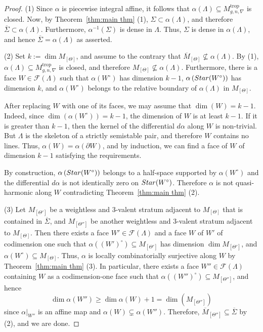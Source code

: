 \documentclass[11pt,reqno]{amsart}
\numberwithin{equation}{section}
\theoremstyle{definition}
\newcommand{\trop}{\mathrm{trop}}
\newcommand{\CF}{{\mathcal F}}
\newcommand{\Star}{{\rm Star}}
\theoremstyle{remark}
\begin{document}
\begin{proof}
(1) Since $\alpha$ is piecewise integral affine, it follows that $\alpha(\Lambda)\subseteq M^{\trop}_{g,n,\nabla}$ is closed. Now, by Theorem~\ref{thm:main thm} (1), $\Sigma\subset \alpha(\Lambda)$, and therefore $\overline\Sigma\subset \alpha(\Lambda)$. Furthermore, $\alpha^{-1}(\Sigma)$ is dense in $\Lambda$. Thus, $\Sigma$ is dense in $\alpha(\Lambda)$, and hence $\overline\Sigma=\alpha(\Lambda)$ as asserted.

(2) Set $k:=\dim M_{[\Theta]}$, and assume to the contrary that $\overline M_{[\Theta]}\nsubseteq \alpha(\Lambda)$. By (1), $\alpha(\Lambda)\subseteq M^{\trop}_{g,n,\nabla}$ is closed, and therefore $M_{[\Theta]}\nsubseteq \alpha(\Lambda)$. Furthermore, there is a face $W\in \CF(\Lambda)$ such that $\alpha(W^\circ)$ has dimension $k-1$, $\alpha\left(\Star(W^\circ)\right)$ has dimension $k$, and $\alpha(W^\circ)$ belongs to the relative boundary of $\alpha(\Lambda)$ in $M_{[\Theta]}$.

After replacing $W$ with one of its faces, we may assume that $\dim(W)=k-1$. Indeed, since $\dim(\alpha(W^\circ))=k-1$, the dimension of $W$ is at least $k-1$. If it is greater than $k-1$, then the kernel of the differential $d\alpha$ along $W$ is non-trivial. But $\Lambda$ is the skeleton of a strictly semistable pair, and therefore $W$ contains no lines. Thus, $\alpha(W)=\alpha(\partial W)$, and by induction, we can find a face of $W$ of dimension $k-1$ satisfying the requirements.

By construction, $\alpha\left(\Star(W^\circ)\right)$ belongs to a half-space supported by $\alpha(W^\circ)$ and the differential $d\alpha$ is not identically zero on $\Star(W^\circ)$. Therefore $\alpha$ is not quasi-harmonic along $W$ contradicting Theorem~\ref{thm:main thm} (2).

(3) Let $M_{[\Theta']}$ be a weightless and $3$-valent stratum adjacent to $M_{[\Theta]}$ that is contained in $\overline\Sigma$, and $M_{[\Theta'']}$ be another weightless and $3$-valent stratum adjacent to $M_{[\Theta]}$. Then there exists a face $W'\in\mathcal F(\Lambda)$ and a face $W$ of $W'$ of codimension one such that $\alpha\left((W')^\circ\right)\subseteq M_{[\Theta']}$ has dimension $\dim M_{[\Theta']}$, and $\alpha(W^\circ)\subseteq M_{[\Theta]}$. Thus, $\alpha$ is locally combinatorially surjective along $W$ by Theorem~\ref{thm:main thm} (3). In particular, there exists a face $W''\in\mathcal F(\Lambda)$ containing $W$ as a codimension-one face such that $\alpha\left((W'')^\circ\right)\subseteq M_{[\Theta'']}$, and hence 
$$\dim \alpha\left(W''\right) \ge \dim \alpha(W)+1=\dim\left(M_{[\Theta'']}\right)$$
since $\alpha|_{W''}$ is an affine map and $\alpha(W)\subsetneq\alpha(W'')$.
Therefore, $\overline M_{[\Theta'']}\subseteq \overline{\Sigma}$ by (2), and we are done.
\end{proof}
\end{document}
